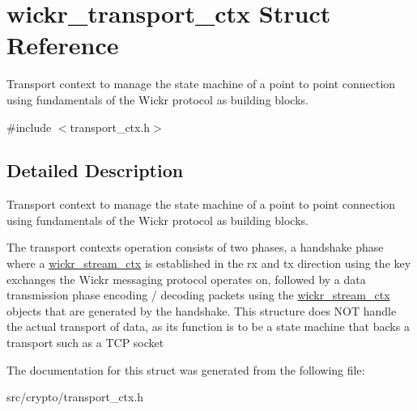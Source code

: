 \hypertarget{structwickr__transport__ctx}{}\section{wickr\+\_\+transport\+\_\+ctx Struct Reference}
\label{structwickr__transport__ctx}


Transport context to manage the state machine of a point to point connection using fundamentals of the Wickr protocol as building blocks.  




{\ttfamily \#include $<$transport\+\_\+ctx.\+h$>$}



\subsection{Detailed Description}
Transport context to manage the state machine of a point to point connection using fundamentals of the Wickr protocol as building blocks. 

The transport context\textquotesingle{}s operation consists of two phases, a handshake phase where a \hyperlink{structwickr__stream__ctx}{wickr\+\_\+stream\+\_\+ctx} is established in the rx and tx direction using the key exchanges the Wickr messaging protocol operates on, followed by a data transmission phase encoding / decoding packets using the \hyperlink{structwickr__stream__ctx}{wickr\+\_\+stream\+\_\+ctx} objects that are generated by the handshake. This structure does N\+OT handle the actual transport of data, as it\textquotesingle{}s function is to be a state machine that backs a transport such as a T\+CP socket 

The documentation for this struct was generated from the following file\+:\begin{DoxyCompactItemize}
\item 
src/crypto/transport\+\_\+ctx.\+h\end{DoxyCompactItemize}
